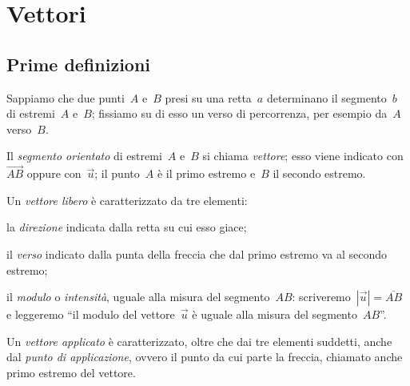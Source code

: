 

\chapter{Vettori}

\section{Prime definizioni}

Sappiamo che due punti~$A$ e~$B$ presi su una retta~$a$ determinano il segmento~$b$ di estremi~$A$ e~$B$; fissiamo su di esso un verso di percorrenza, per esempio da~$A$ verso~$B$.

\begin{definizione}
Il \emph{segmento orientato} di estremi~$A$ e~$B$ si chiama \emph{vettore}; esso viene indicato con~$\overrightarrow{AB}$ oppure con~$\vec{u}$;
il punto~$A$ è il primo estremo e~$B$ il secondo estremo.
\end{definizione}

Un \emph{vettore libero} è caratterizzato da tre elementi:
\begin{itemize*}
\item la \emph{direzione} indicata dalla retta su cui esso giace;
\item il \emph{verso} indicato dalla punta della freccia che dal primo estremo va al secondo estremo;
\item il \emph{modulo} o \emph{intensità}, uguale alla misura del segmento~$AB$: scriveremo~$|\vec{u}|=\overline{AB}$ e leggeremo ``il modulo del vettore~$\vec{u}$ è
uguale alla misura del segmento~$AB$''.
\end{itemize*}

Un \emph{vettore applicato} è caratterizzato, oltre che dai tre elementi suddetti, anche dal \emph{punto di applicazione},
ovvero il punto da cui parte la freccia, chiamato anche primo estremo del vettore.

